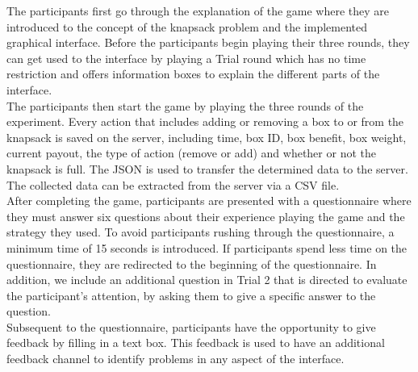 The participants first go through the explanation of the game where they are introduced to the concept of the knapsack problem and the implemented graphical interface. 
Before the participants begin playing their three rounds, they can get used to the interface by playing a Trial round which has no time restriction and offers information boxes to explain the different parts of the interface.\\
The participants then start the game by playing the three rounds of the experiment. Every action that includes adding or removing a box to or from the knapsack is saved on the server, including time, box ID, box benefit, box weight, current payout, the type of action (remove or add) and whether or not the knapsack is full.
The \ac{JSON} is used to transfer the determined data to the server. The collected data can be extracted from the server via a \ac{CSV} file.\\
After completing the game, participants are presented with a questionnaire where they must answer six questions about their experience playing the game and the strategy they used. To avoid participants rushing through the questionnaire, a minimum time of 15 seconds is introduced. If participants spend less time on the questionnaire, they are redirected to the beginning of the questionnaire. In addition, we include an additional question in Trial 2 that is directed to evaluate the participant's attention, by asking them to give a specific answer to the question.\\
Subsequent to the questionnaire, participants have the opportunity to give feedback by filling in a text box. This feedback is used to have an additional feedback channel to identify problems in any aspect of the interface.\\
